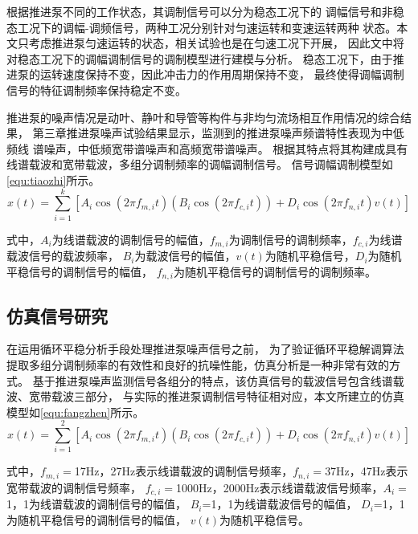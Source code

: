 根据推进泵不同的工作状态，其调制信号可以分为稳态工况下的
调幅信号和非稳态工况下的调幅-调频信号，两种工况分别针对匀速运转和变速运转两种
状态。本文只考虑推进泵匀速运转的状态，相关试验也是在匀速工况下开展，
因此文中将对稳态工况下的调幅调制信号的调制模型进行建模与分析。 
稳态工况下，由于推进泵的运转速度保持不变，因此冲击力的作用周期保持不变，
最终使得调幅调制信号的特征调制频率保持稳定不变。

推进泵的噪声情况是动叶、静叶和导管等构件与非均匀流场相互作用情况的综合结果，
第三章推进泵噪声试验结果显示，监测到的推进泵噪声频谱特性表现为中低频线
谱噪声，中低频宽带谱噪声和高频宽带谱噪声。
根据其特点将其构建成具有线谱载波和宽带载波，多组分调制频率的调幅调制信号。
信号调幅调制模型如\autoref{equ:tiaozhi}所示。
\begin{equation}
    \label{equ:tiaozhi}
    x\left ( t \right ) =\sum_{i=1}^{k}\left [ A_{i}\cos \left ( 2\pi f_{m,i}t  \right )\left ( B_{i}\cos\left ( 2\pi f_{c,i}t  \right )   \right )+D_{i}\cos\left ( 2\pi f_{n,i}t  \right )v\left ( t \right )      \right ]  
\end{equation}

式中，$A_i$为线谱载波的调制信号的幅值，$f_{m,i}$为调制信号的调制频率，$f_{c,i}$为线谱载波信号的载波频率，
$B_i$为载波信号的幅值，$v\left ( t \right )$为随机平稳信号，$D_i$为随机平稳信号的调制信号的幅值，
$f_{n,i}$为随机平稳信号的调制信号的调制频率。
\subsection{仿真信号研究}
在运用循环平稳分析手段处理推进泵噪声信号之前，
为了验证循环平稳解调算法提取多组分调制频率的有效性和良好的抗噪性能，仿真分析是一种非常有效的方
式。
基于推进泵噪声监测信号各组分的特点，该仿真信号的载波信号包含线谱载波、宽带载波三部分，
与实际的推进泵调制信号特征相对应，本文所建立的仿真模型如\autoref{equ:fangzhen}所示。 
\begin{equation}
    \label{equ:fangzhen}
    x\left ( t \right ) =\sum_{i=1}^{2}\left [ A_{i}\cos \left ( 2\pi f_{m,i}t  \right )\left ( B_{i}\cos\left ( 2\pi f_{c,i}t  \right )   \right )+D_{i}\cos\left ( 2\pi f_{n,i}t  \right )v\left ( t \right )      \right ]  
\end{equation}

式中，$f_{m,i}=$17Hz，27Hz表示线谱载波的调制信号频率，$f_{n,i}=$37Hz，47Hz表示宽带载波的调制信号频率，
$f_{c,i}=$1000Hz，2000Hz表示线谱载波信号频率，$A_i=$1，1为线谱载波的调制信号的幅值，
$B_i$=1，1为线谱载波信号的幅值，
$D_i$=1，1为随机平稳信号的调制信号的幅值，
$v\left ( t \right )$为随机平稳信号。

